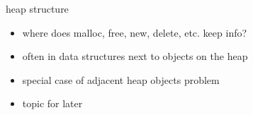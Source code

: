 \begin{frame}{heap structure}
    \begin{itemize}
    \item where does malloc, free, new, delete, etc. keep info?
    \item often in data structures next to objects on the heap
    \vspace{.5cm}
    \item special case of adjacent heap objects problem
    \item topic for later
    \end{itemize}
\end{frame}
